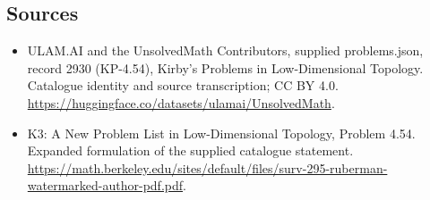 \documentclass[11pt,a4paper]{article}
\begin{document}
\subsection{Sources}
\begin{itemize}
\item[S1] ULAM.AI and the UnsolvedMath Contributors, supplied problems.json, record 2930 (KP-4.54), Kirby's Problems in Low-Dimensional Topology. Catalogue identity and source transcription; CC BY 4.0.
\url{https://huggingface.co/datasets/ulamai/UnsolvedMath}.
\item[S2] K3: A New Problem List in Low-Dimensional Topology, Problem 4.54. Expanded formulation of the supplied catalogue statement.
\url{https://math.berkeley.edu/sites/default/files/surv-295-ruberman-watermarked-author-pdf.pdf}.
\end{itemize}
\end{document}

